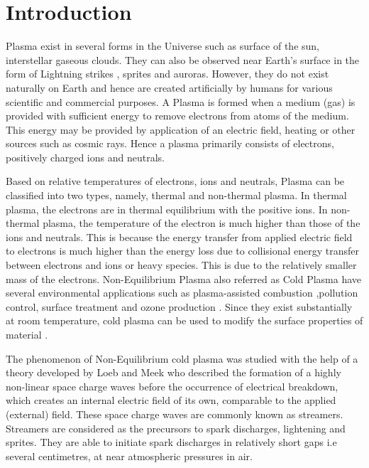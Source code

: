 \documentclass{article}
\begin{document}

\justifying

\section{Introduction}

Plasma exist in several forms in the Universe such as surface of the sun, interstellar gaseous clouds. They can also be observed near Earth's surface in the form of Lightning strikes \cite{Bazelyan2000TheLasers} \cite{Raizer1991GasRazryada}, sprites \cite{Bourdon2007EfficientEquations} \cite{Franz1990TelevisionSystem} and auroras. However, they do not exist naturally on Earth and hence are created artificially by humans for various scientific and commercial purposes. A Plasma is formed when a medium (gas) is provided with sufficient energy to remove electrons from atoms of the medium. This energy may be provided by application of an electric field, heating or other sources such as cosmic rays. Hence a plasma primarily consists of electrons, positively charged ions and neutrals.

Based on relative temperatures of electrons, ions and neutrals, Plasma can be classified into two types, namely, thermal and non-thermal plasma. In thermal plasma, the electrons are in thermal equilibrium with the positive ions. In non-thermal plasma, the temperature of the electron is much higher than those of the ions and neutrals. This is because the energy transfer from applied electric field to electrons is much higher than the energy loss due to collisional energy transfer between electrons and ions or heavy species. This is due to the relatively smaller mass of the electrons. Non-Equilibrium Plasma also referred as Cold Plasma have several environmental applications such as plasma-assisted combustion \cite{Starikovskaia2006PlasmaCombustion} \cite{Popov2016KineticsMixtures},pollution control, surface treatment \cite{Kogelschatz2002FilamentaryDischarges}  and ozone production \cite{Eliasson1991ModelingPlasmas}. Since they exist substantially at room temperature, cold plasma can be used to modify the surface properties of material \cite{Bonizzoni2002PlasmaApplications}.

The phenomenon of Non-Equilibrium cold plasma was studied with the help of a theory developed by Loeb and Meek \cite{Loeb1929THEPRESSURE} who described the formation of a highly non-linear space charge waves before the occurrence of electrical breakdown, which creates an internal electric field of its own, comparable to the applied (external) field. These space charge waves are commonly known as streamers. Streamers are considered as the precursors to spark discharges, lightening and sprites. They are able to initiate spark discharges in relatively short gaps i.e several centimetres, at near atmospheric pressures in air.  
\end{document}
